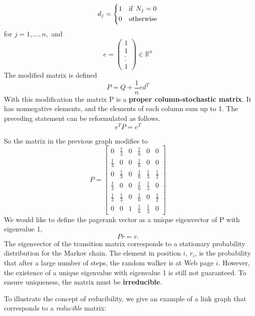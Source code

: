 \documentclass[a4paper]{article}
\begin{document}
\[
    d_{j} = \begin{dcases}
    1   &  \mathrm{if}\ N_j = 0                   \\
    0   &  \mathrm{otherwise}        \\
      \end{dcases}
    \]
for $j = 1, . . . , n,$ and
$$e = \begin{pmatrix}
  1\\ 
  1\\
  .\\
  .\\
  1
\end{pmatrix} \in \mathbb{R}^n$$
The modified matrix is defined
$$P = Q + \frac{1}{n}ed^T$$
With this modification the matrix P is a \textbf{proper column-stochastic matrix}. It has
nonnegative elements, and the elements of each column sum up to 1. The preceding
statement can be reformulated as follows.
$$e^TP = e^T$$

So the matrix in the previous graph modifies to 
$$
P = \begin{bmatrix}
0 & \frac{1}{3} & 0 & \frac{1}{6} & 0 & 0\\
\frac{1}{3} & 0 & 0 & \frac{1}{6} & 0 & 0\\
0 & \frac{1}{3} & 0 & \frac{1}{6} & \frac{1}{3} & \frac{1}{2}\\
\frac{1}{3} & 0 & 0 & \frac{1}{6} & \frac{1}{3} & 0\\
\frac{1}{3} &\frac{1}{3} & 0 & \frac{1}{6} & 0 & \frac{1}{2}\\
0 & 0 & 1 & \frac{1}{6} & \frac{1}{3} & 0
\end{bmatrix}
$$
We would like to define the pagerank vector as a unique
eigenvector of P with eigenvalue 1,
$$Pr = r.$$
The eigenvector of the transition matrix corresponds to a stationary probability
distribution for the Markov chain. The element in position $i$, $r_i$, is the probability
that after a large number of steps, the random walker is at Web page $i$. However,
the existence of a unique eigenvalue with eigenvalue 1 is still not guaranteed. To
ensure uniqueness, the matrix must be \textbf{irreducible}.

To illustrate the concept of reducibility, we give an example of a
link graph that corresponds to a \textit{reducible} matrix:
\end{document}
